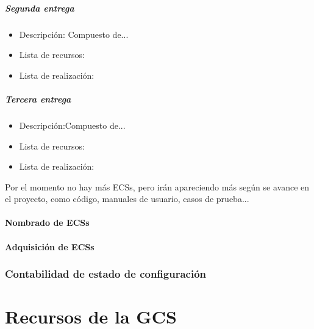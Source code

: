 \documentclass[spanish,a4paper,11pt, twoside]{report}	%
\begin{document}
			\subsubsection{Segunda entrega}
			\begin{itemize}	
				\item{Descripción:} Compuesto de...
				\item{Lista de recursos:}
				\item{Lista de realización:}
			\end{itemize}	

			\subsubsection{Tercera entrega}
			\begin{itemize}	
				\item{Descripción:}Compuesto de...
				\item{Lista de recursos:}
				\item{Lista de realización:}
			\end{itemize}	

			Por el momento no hay más ECSs, pero irán apareciendo más según se avance en el proyecto, como código, manuales de usuario, casos de prueba...

		\subsection{Nombrado de ECSs} %
		
		
		\subsection{Adquisición de ECSs} %


	\section{Contabilidad de estado de configuración} %


\newpage
\mbox{}
\thispagestyle{empty}						%
\newpage

\setcounter{section}{0}

\part{Recursos de la GCS}

\newpage
\mbox{}
\thispagestyle{empty}						%
\newpage
\end{document}
